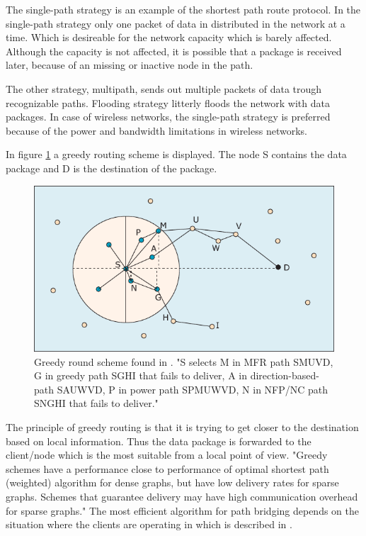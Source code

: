 \documentclass[10pt,a4paper]{article}
\begin{document}
The single-path strategy is an example of the shortest path route protocol. In the single-path strategy only one packet of data in distributed in the network at a time. Which is desireable for the network capacity which is barely affected. Although the capacity is not affected, it is possible that a package is received later, because of an missing or inactive node in the path. \cite{position-based}

The other strategy, multipath, sends out multiple packets of data trough recognizable paths. Flooding strategy litterly floods the network with data packages. In case of wireless networks, the single-path strategy is preferred because of the power and bandwidth limitations in wireless networks. \cite{position-based}



In figure \ref{fig:greedyrouting} a greedy routing scheme is displayed. The node S contains the data package and D is the destination of the package. 

\begin{figure}[H]
   \centering
   \includegraphics[width=1\textwidth]{greedyrouting}
   \caption{Greedy round scheme found in \cite{position-based}. "S selects M in MFR path SMUVD, G in greedy path SGHI that
fails to deliver, A in direction-based-path SAUWVD, P in power path
SPMUWVD, N in NFP/NC path SNGHI that fails to deliver."}
   \label{fig:greedyrouting}
\end{figure}

The principle of greedy routing is that it is trying to get closer to the destination based on local information. Thus the data package is forwarded to the client/node which is the most suitable from a local point of view. \cite{geographicrouting} "Greedy schemes have a performance close to performance of optimal shortest path (weighted) algorithm for dense graphs, but have low delivery rates for sparse graphs. Schemes that guarantee delivery may have high communication overhead for sparse graphs." \cite{position-based} The most efficient algorithm for path bridging depends on the situation where the clients are operating in which is described in \cite{position-based}.
\end{document}
